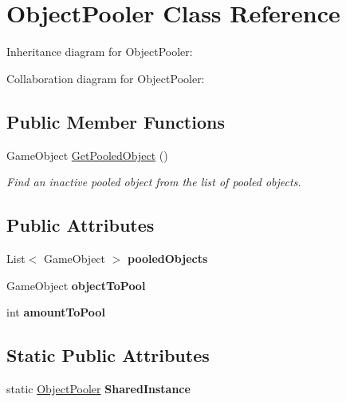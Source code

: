 \hypertarget{class_object_pooler}{}\section{Object\+Pooler Class Reference}
\label{class_object_pooler}


Inheritance diagram for Object\+Pooler\+:


Collaboration diagram for Object\+Pooler\+:
\subsection*{Public Member Functions}
\begin{DoxyCompactItemize}
\item 
Game\+Object \mbox{\hyperlink{class_object_pooler_a101205cb37c92020450d499bc8f2bad3}{Get\+Pooled\+Object}} ()
\begin{DoxyCompactList}\small\item\em Find an inactive pooled object from the list of pooled objects. \end{DoxyCompactList}\end{DoxyCompactItemize}
\subsection*{Public Attributes}
\begin{DoxyCompactItemize}
\item 
\mbox{\label{class_object_pooler_a46632fc0e61865fbef3cd7571cd2cc72}} 
List$<$ Game\+Object $>$ {\bfseries pooled\+Objects}
\item 
\mbox{\label{class_object_pooler_a2ab87dde01570d72e5709cc93545f6a8}} 
Game\+Object {\bfseries object\+To\+Pool}
\item 
\mbox{\label{class_object_pooler_ac5fc11973644b39a3afb46ef93e1cb0a}} 
int {\bfseries amount\+To\+Pool}
\end{DoxyCompactItemize}
\subsection*{Static Public Attributes}
\begin{DoxyCompactItemize}
\item 
\mbox{\label{class_object_pooler_a16b3421a0733ea0d0669b01864f01fd0}} 
static \mbox{\hyperlink{class_object_pooler}{Object\+Pooler}} {\bfseries Shared\+Instance}
\end{DoxyCompactItemize}


